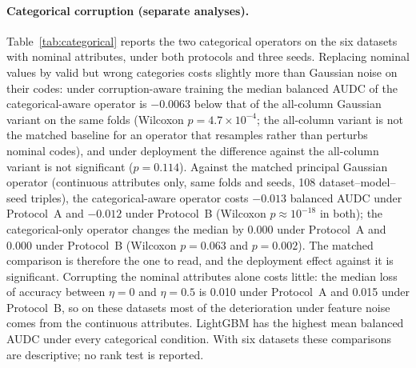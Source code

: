 \documentclass[pdflatex,sn-mathphys]{sn-jnl}
\theoremstyle{thmstyleone}
\theoremstyle{thmstyletwo}
\theoremstyle{thmstylethree}
\begin{document}
\paragraph{Categorical corruption (separate analyses).} Table~\ref{tab:categorical} reports the two categorical operators on the six datasets with nominal attributes, under both protocols and three seeds. Replacing nominal values by valid but wrong categories costs slightly more than Gaussian noise on their codes: under corruption-aware training the median balanced AUDC of the categorical-aware operator is $-0.0063$ below that of the all-column Gaussian variant on the same folds (Wilcoxon $p=4.7\times10^{-4}$; the all-column variant is not the matched baseline for an operator that resamples rather than perturbs nominal codes), and under deployment the difference against the all-column variant is not significant ($p=0.114$). Against the matched principal Gaussian operator (continuous attributes only, same folds and seeds, 108 dataset--model--seed triples), the categorical-aware operator costs $-0.013$ balanced AUDC under Protocol~A and $-0.012$ under Protocol~B (Wilcoxon $p\approx10^{-18}$ in both); the categorical-only operator changes the median by $0.000$ under Protocol~A and $0.000$ under Protocol~B (Wilcoxon $p=0.063$ and $p=0.002$). The matched comparison is therefore the one to read, and the deployment effect against it is significant. Corrupting the nominal attributes alone costs little: the median loss of accuracy between $\eta=0$ and $\eta=0.5$ is 0.010 under Protocol~A and 0.015 under Protocol~B, so on these datasets most of the deterioration under feature noise comes from the continuous attributes. LightGBM has the highest mean balanced AUDC under every categorical condition. With six datasets these comparisons are descriptive; no rank test is reported.
\end{document}
